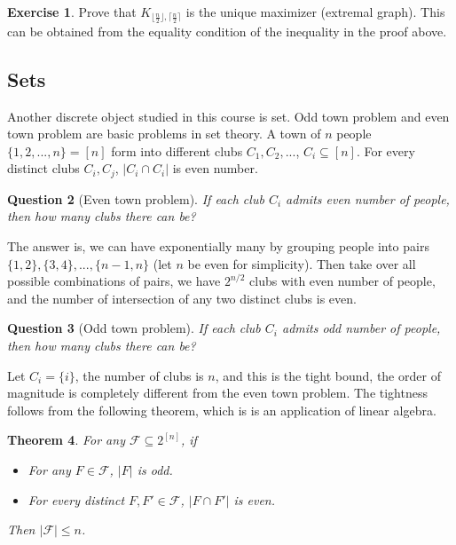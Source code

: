 \documentclass{article}
\newtheorem{theorem}{Theorem}[section]
\newtheorem{question}[theorem]{Question}
\theoremstyle{definition}
\newtheorem{exercise}[theorem]{Exercise}
\begin{document}
\begin{exercise}
    Prove that $K_{\lfloor\frac{n}{2}\rfloor,\lceil\frac{n}{2}\rceil}$ is the unique maximizer (extremal graph). This can be obtained from the equality condition of the inequality in the proof above.
\end{exercise}

\subsection{Sets}

Another discrete object studied in this course is set. Odd town problem and even town problem are basic problems in set theory. A town of $n$ people $\{ 1,2,...,n\}=[n]$ form into different clubs $C_{1},C_{2},...$, $C_{i}\subseteq [n]$. For every distinct clubs $C_{i}, C_{j}$, $|C_{i}\cap C_{i}|$ is even number.

\begin{question}[Even town problem]
    If each club $C_{i}$ admits even number of people, then how many clubs there can be?
\end{question}

The answer is, we can have exponentially many by grouping people into pairs $\{1,2\},\{3,4\},...,\{n-1,n\}$ (let $n$ be even for simplicity). 
Then take over all possible combinations of pairs, we have $2^{n/2}$ clubs with even number of people, and the number of intersection of any two distinct clubs is even.

\begin{question}[Odd town problem]
    If each club $C_{i}$ admits odd number of people, then how many clubs there can be?
\end{question}

Let $C_{i}=\{ i\}$, the number of clubs is $n$, and this is the tight bound, the order of magnitude is completely different from the even town problem. The tightness follows from the following theorem, which is is an application of linear algebra.

\begin{theorem}
    For any $\mathcal{F}\subseteq 2^{[n]}$, if
    \begin{itemize}
        \item[(1)] For any $F\in\mathcal{F}$, $|F|$ is odd.
        \item[(2)] For every distinct $F,F'\in\mathcal{F}$, $|F\cap F'|$ is even.
    \end{itemize}
    Then $|\mathcal{F}|\leq n$.
\end{theorem}
\end{document}
